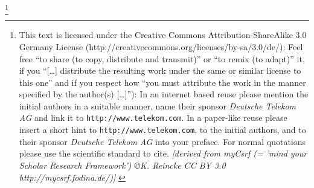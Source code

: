 %
%
%
%
%
\footnote{
This text is licensed under the Creative Commons Attribution-ShareAlike 3.0 Germany
License (http://creativecommons.org/licenses/by-sa/3.0/de/): Feel free \enquote{to
share (to copy, distribute and transmit)} or \enquote{to remix (to
adapt)} it, if you \enquote{[\ldots] distribute the resulting work under the
same or similar license to this one} and if you respect how \enquote{you
must attribute the work in the manner specified by the author(s)
[\ldots]}):
\newline
In an internet based reuse please mention the initial authors in a suitable
manner, name their sponsor \textit{Deutsche Telekom AG} and link it to
\texttt{http://www.telekom.com}. In a paper-like reuse please insert a short
hint to \texttt{http://www.telekom.com}, to the initial authors, and to their
sponsor \textit{Deutsche Telekom AG} into your preface. For normal quotations
please use the scientific standard to cite.
\newline
{ \tiny \itshape [derived from myCsrf (= 'mind your Scholar Research Framework') 
\copyright K. Reincke CC BY 3.0  http://mycsrf.fodina.de/)] }}